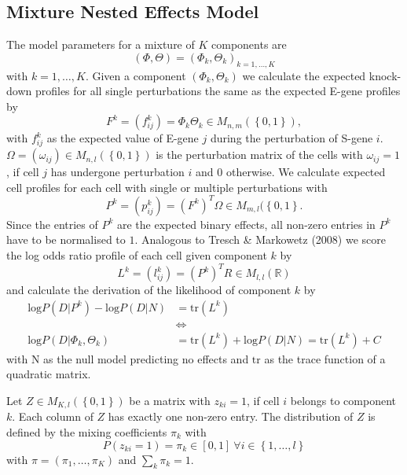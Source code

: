 \documentclass[12pt]{article}
\begin{document}
\subsection{Mixture Nested Effects Model}
The model parameters for a mixture of $K$ components are
\begin{equation*}
(\Phi, \Theta ) = ( \Phi_k, \Theta_k )_{k = 1,\dots,K} 
\end{equation*}
with $k = 1, \dots, K$. Given a component $(\Phi_k, \Theta_k)$ we calculate the expected knock-down profiles for all single perturbations the same as the expected E-gene profiles by
\begin{equation*}
F^k = ( f_{ij}^k ) = \Phi_k \Theta_k \in M_{n,m}(\left\{0,1\right\}),
\end{equation*}
with $f^k_{ij}$ as the expected value of E-gene $j$ during the perturbation of S-gene $i$.
$\Omega = ( \omega_{ij} ) \in M_{n,l}(\left\{0,1\right\})$ is the perturbation matrix of the cells with $\omega_{ij} = 1$, if cell $j$ has undergone perturbation $i$ and $0$ otherwise. We calculate expected cell profiles for each cell with single or multiple perturbations with
\begin{equation}\label{eq:Pk}
P^k = (p^k_{ij}) = (F^k)^T \Omega \in M_{m,l}(\left\{0,1\right\}.
\end{equation}
Since the entries of $P^k$ are the expected binary effects, all non-zero entries in $P^k$ have to be normalised to $1$. Analogous to Tresch \& Markowetz (2008) we score the log odds ratio profile of each cell given component $k$ by
\begin{equation}\label{eq:Lk}
L^k = (l^k_{ij}) = (P^k)^T R \in M_{l,l}(\mathbb{R})
\end{equation}
and calculate the derivation of the likelihood of component $k$ by
\begin{align*}
\mathrm{log}P(D|P^k) - \mathrm{log}P(D|N) &= \mathrm{tr}(L^k)\nonumber\\
&\Leftrightarrow\nonumber\\
\mathrm{log}P(D|\Phi_k, \Theta_k) &= \mathrm{tr}(L^k) + \mathrm{log}P(D|N) = \mathrm{tr}(L^k) + C
\end{align*}
with N as the null model predicting no effects and $\mathrm{tr}$ as the trace function of a quadratic matrix.

Let $Z \in M_{K,l}(\left\{0,1\right\})$ be a matrix with $z_{ki} = 1$, if cell $i$ belongs to component $k$. Each column of $Z$ has exactly one non-zero entry. The distribution of $Z$ is defined by the mixing coefficients $\pi_k$ with
\begin{equation*}
P(z_{ki} = 1) = \pi_k \in [0,1] ~\forall i \in \left\{1,\dots,l\right\}
\end{equation*}
with $\pi = (\pi_1,\dots,\pi_K)$ and $\sum\limits_k \pi_k = 1$.
\end{document}
